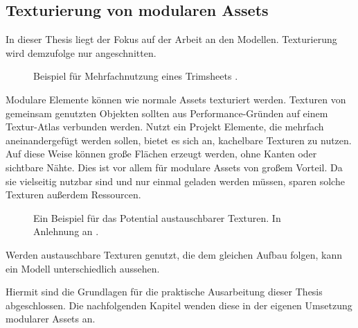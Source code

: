 \subsection{Texturierung  von modularen Assets}
In dieser Thesis liegt der Fokus auf der Arbeit an den Modellen. Texturierung wird demzufolge nur angeschnitten.
\par
\begin{figure}[H]
\centering
  \caption{Beispiel für Mehrfachnutzung eines Trimsheets \parencite{Klafke}.}
	\label{trims}
\end{figure}
\vspace{-10.5pt}
Modulare Elemente können wie normale Assets texturiert werden. Texturen von gemeinsam genutzten Objekten sollten aus Performance-Gründen auf einem Textur-Atlas verbunden werden. Nutzt ein Projekt Elemente, die mehrfach aneinandergefügt werden sollen, bietet es sich an, kachelbare Texturen zu nutzen. Auf diese Weise können große Flächen erzeugt werden, ohne Kanten oder sichtbare Nähte. Dies ist vor allem für modulare Assets von großem Vorteil. Da sie vielseitig nutzbar sind und nur einmal geladen werden müssen, sparen solche Texturen außerdem Ressourcen. \parencite{Meler}
\par
\begin{figure}[H]
\centering
  \caption{Ein Beispiel für das Potential austauschbarer Texturen. In Anlehnung an \parencite{Fallout4P}.}
	\label{MaterialSwap}
\end{figure}
\vspace{-10.5pt}
Werden austauschbare Texturen genutzt, die dem gleichen Aufbau folgen, kann ein Modell unterschiedlich aussehen. \parencite{Norris}
\par
Hiermit sind die Grundlagen für die praktische Ausarbeitung dieser Thesis abgeschlossen. Die nachfolgenden Kapitel wenden diese in der eigenen Umsetzung modularer Assets an.
\enlargethispage{11.5pt}
